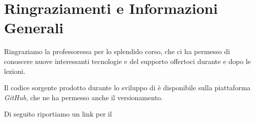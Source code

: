 \chapter{Ringraziamenti e Informazioni Generali}
  Ringraziamo la professoressa \href{mailto:alessandra.rossi@unina.it}{} per lo splendido corso, che ci ha permesso di conoscere nuove interessanti tecnologie e del supporto offertoci durante e dopo le lezioni.


  Il codice sorgente prodotto durante lo sviluppo di  è disponibile sulla piattaforma \emph{GitHub}, che ne ha permesso anche il versionamento.

  \begin{center} Di seguito riportiamo un link per il \href{https://github.com/luftmensch-luftmensch/InfoPoint/}{}\footnotemark {} \end{center}
